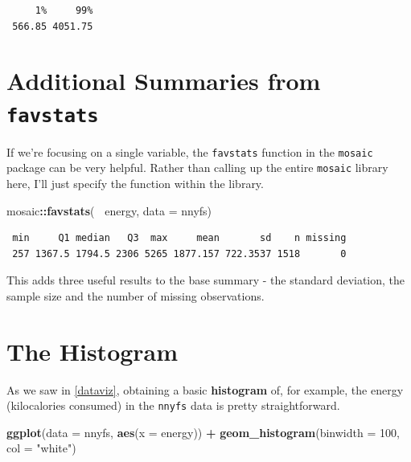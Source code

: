 \documentclass[
]{book}
\newenvironment{Shaded}{\begin{snugshade}}{\end{snugshade}}
\newcommand{\DataTypeTok}[1]{\textcolor[rgb]{0.13,0.29,0.53}{#1}}
\newcommand{\DecValTok}[1]{\textcolor[rgb]{0.00,0.00,0.81}{#1}}
\newcommand{\KeywordTok}[1]{\textcolor[rgb]{0.13,0.29,0.53}{\textbf{#1}}}
\newcommand{\NormalTok}[1]{#1}
\newcommand{\OperatorTok}[1]{\textcolor[rgb]{0.81,0.36,0.00}{\textbf{#1}}}
\newcommand{\StringTok}[1]{\textcolor[rgb]{0.31,0.60,0.02}{#1}}
\begin{document}
\begin{verbatim}
     1%     99% 
 566.85 4051.75 
\end{verbatim}

\hypertarget{additional-summaries-from-favstats}{%
\section{\texorpdfstring{Additional Summaries from \texttt{favstats}}{Additional Summaries from favstats}}\label{additional-summaries-from-favstats}}

If we're focusing on a single variable, the \texttt{favstats} function in the \texttt{mosaic} package can be very helpful. Rather than calling up the entire \texttt{mosaic} library here, I'll just specify the function within the library.

\begin{Shaded}
\begin{Highlighting}[]
\NormalTok{mosaic}\OperatorTok{::}\KeywordTok{favstats}\NormalTok{(}\OperatorTok{~}\StringTok{ }\NormalTok{energy, }\DataTypeTok{data =}\NormalTok{ nnyfs)}
\end{Highlighting}
\end{Shaded}

\begin{verbatim}
 min     Q1 median   Q3  max     mean       sd    n missing
 257 1367.5 1794.5 2306 5265 1877.157 722.3537 1518       0
\end{verbatim}

This adds three useful results to the base summary - the standard deviation, the sample size and the number of missing observations.

\hypertarget{the-histogram}{%
\section{The Histogram}\label{the-histogram}}

As we saw in \ref{dataviz}, obtaining a basic \textbf{histogram} of, for example, the energy (kilocalories consumed) in the \texttt{nnyfs} data is pretty straightforward.

\begin{Shaded}
\begin{Highlighting}[]
\KeywordTok{ggplot}\NormalTok{(}\DataTypeTok{data =}\NormalTok{ nnyfs, }\KeywordTok{aes}\NormalTok{(}\DataTypeTok{x =}\NormalTok{ energy)) }\OperatorTok{+}
\StringTok{    }\KeywordTok{geom_histogram}\NormalTok{(}\DataTypeTok{binwidth =} \DecValTok{100}\NormalTok{, }\DataTypeTok{col =} \StringTok{"white"}\NormalTok{)}
\end{Highlighting}
\end{Shaded}
\end{document}
